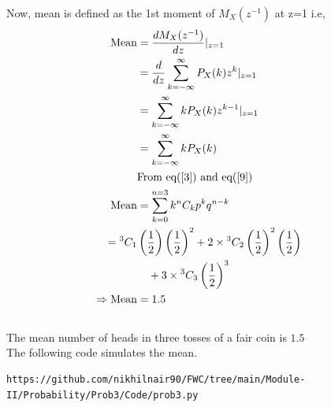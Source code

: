 \documentclass[journal,12pt,twocolumn]{IEEEtran}
\begin{document}
Now, mean is defined as the 1st moment of $M_X(z^{-1})$ at z=1 i.e,
\begin{align}
\text{Mean}&= \frac{dM_X(z^{-1})
}{dz}|_{z=1}&
\\
&= \frac{d}{dz}\sum_{k=-\infty}^{\infty} P_X(k) z^{k}|_{z=1}&
\\
&=\sum_{k=-\infty}^{\infty} k P_X(k) z^{k-1}|_{z=1}&
\\
&= \sum_{k=-\infty}^{\infty} k P_X(k)&   \label{9}
\\
&\text{From eq($\ref{3}$) and eq($\ref{9}$)}& \nonumber
\\
\text{Mean}&= \sum_{k=0}^{n=3} k {}^nC_kp^{k}q^{n-k}&
\\
= {}^3C_1&\left(\frac{1}{2}\right)\left(\frac{1}{2}\right)^{2}+2\times{}^3C_2\left(\frac{1}{2}\right)^{2}\left(\frac{1}{2}\right)& \nonumber \\ 
& \quad+3\times{}^3C_3\left(\frac{1}{2}\right)^{3}&
\\
\Rightarrow\text{Mean} &= 1.5&
\end{align}
\\
The mean number of heads in three tosses of a fair coin is $1.5$
\\

The following code simulates the mean.

\begin{lstlisting}
https://github.com/nikhilnair90/FWC/tree/main/Module-II/Probability/Prob3/Code/prob3.py
\end{lstlisting}
\end{document}
